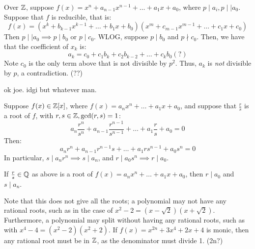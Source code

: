\begin{pf}[source=Primary Source Material,title=Eisenstein's Criterion]
    Over $ \mathbb{Z} $, suppose $ f(x) = x^{n}+a_{n-1}x^{n-1}+\dots+a_{1}x+a_{0} $, where
    $ p \mid a_{i}, p\mid\mid a_{0} $. \vsp
    Suppose that $ f $ is reducible, that is:
    \begin{equation*}
        f(x) = (x^{k}+b_{k-1}x^{k-1}+\dots+b_{1}x+b_{0})(x^{m}+c_{m-1}x^{m-1}+\dots+c_{1}x+c_{0})
    \end{equation*}
    Then $ p \mid\mid a_{0} \implies p \mid b_{0} $ or $ p \mid c_{0} $. WLOG, suppose
    $ p \mid b_{0} $ and $ p \nmid c_{0} $.
    Then, we have that the coefficient of $ x_{k} $ is:
    \begin{equation*}
        a_{k}=c_{0}+c_{1}b_{k}+c_{2}b_{k-2}+\dots+c_{k}b_{0} (?)
    \end{equation*}
    Note $ c_{0} $ is the only term above that is not divisible by $ p^{2} $.
    Thus, $ a_{k} $ is \textit{not} divisible by $ p $, a contradiction. (??)
\end{pf}
ok joe. idgi but whatever man.


Suppose $ f(x) \in \mathbb{Z}[x] $, where $ f(x)=a_{n}x^{n}+\dots+a_{1}x+a_{0} $, and suppose that
$ \frac{r}{s} $ is a root of $ f $, with $ r, s \in \mathbb{Z}, \gcd(r,s)=1 $:
\begin{equation*}
    a_{n}\frac{r^{n}}{s^{n}} + a_{n-1}\frac{r^{n-1}}{s^{n-1}} + \dots + a_{1}\frac{r}{s} + a_{0}
    = 0
\end{equation*}
Then:
\begin{equation*}
    a_{n}r^{n}+a_{n-1}r^{n-1}s+\dots+a_{1}rs^{n-1}+a_{0}s^{n} = 0
\end{equation*}
In particular, $ s \mid a_{n}r^{n} \implies s \mid a_{n} $, and
$ r \mid a_{0}s^{n} \implies r \mid a_{0} $.

\begin{thm}[title=Rational Root Test]
    If $ \frac{r}{s} \in \mathbb{Q} $ as above is a root of $ f(x) = a_{n}x^{n}+\dots+a_{1}x+a_{0} $,
    then $ r \mid a_{0} $ and $ s \mid a_{n} $.
\end{thm}

Note that this does not give all the roots; a polynomial may not have any rational roots, such as
in the case of $ x^{2}-2 = (x-\sqrt{2})(x+\sqrt{2}) $. Furthermore, a polynomial may split without
having any rational roots, such as with $ x^{4}-4 = (x^{2}-2)(x^{2}+2) $.
If $ f(x)=x^{2n}+3x^{4}+2x+4 $ is monic, then any rational root must be in $ \mathbb{Z} $, as the
denominator must divide 1. (2n?)

